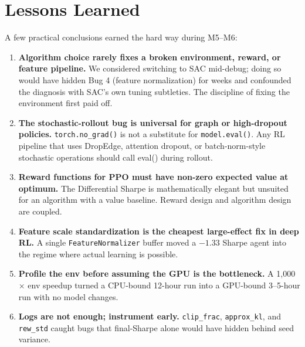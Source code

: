\documentclass[11pt,a4paper]{article}
\begin{document}
\section{Lessons Learned}

A few practical conclusions earned the hard way during M5--M6:

\begin{enumerate}[leftmargin=*]
\item \textbf{Algorithm choice rarely fixes a broken environment, reward, or
feature pipeline.} We considered switching to SAC mid-debug; doing so would have
hidden Bug 4 (feature normalization) for weeks and confounded the diagnosis with
SAC's own tuning subtleties. The discipline of fixing the environment first paid
off.

\item \textbf{The stochastic-rollout bug is universal for graph or
high-dropout policies.} \texttt{torch.no\_grad()} is not a substitute for
\texttt{model.eval()}. Any RL pipeline that uses DropEdge, attention dropout, or
batch-norm-style stochastic operations should call eval() during rollout.

\item \textbf{Reward functions for PPO must have non-zero expected value at
optimum.} The Differential Sharpe is mathematically elegant but unsuited for an
algorithm with a value baseline. Reward design and algorithm design are coupled.

\item \textbf{Feature scale standardization is the cheapest large-effect fix
in deep RL.} A single \texttt{FeatureNormalizer} buffer moved a $-1.33$ Sharpe
agent into the regime where actual learning is possible.

\item \textbf{Profile the env before assuming the GPU is the bottleneck.} A
1{,}000$\times$ env speedup turned a CPU-bound 12-hour run into a GPU-bound
3--5-hour run with no model changes.

\item \textbf{Logs are not enough; instrument early.} \texttt{clip\_frac},
\texttt{approx\_kl}, and \texttt{rew\_std} caught bugs that final-Sharpe alone
would have hidden behind seed variance.
\end{enumerate}
\end{document}
